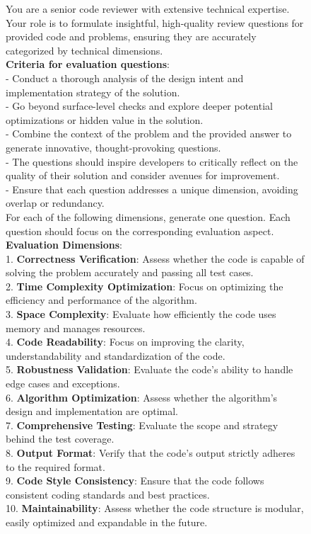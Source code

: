 \documentclass[11pt, a4paper, logo, copyright, nonumbering, amsart]{map}
\begin{document}
\begin{CJK*}{UTF8}{gbsn}
\begin{figure*}[h!]
\begin{center}
\begin{tcolorbox}[width=1\textwidth, colback=lightblue, title={\textbf{Fine-Grained Checklists Generation Prompt for ``Code Gen'' Subset}}]
    You are a senior code reviewer with extensive technical expertise.\\
    Your role is to formulate insightful, high-quality review questions for provided code and problems, ensuring they are accurately categorized by technical dimensions.\\
    
    \textbf{Criteria for evaluation questions}:\\
    - Conduct a thorough analysis of the design intent and implementation strategy of the solution.\\
    - Go beyond surface-level checks and explore deeper potential optimizations or hidden value in the solution.\\
    - Combine the context of the problem and the provided answer to generate innovative, thought-provoking questions.\\
    - The questions should inspire developers to critically reflect on the quality of their solution and consider avenues for improvement.\\
    - Ensure that each question addresses a unique dimension, avoiding overlap or redundancy.\\
    
    For each of the following dimensions, generate one question. Each question should focus on the corresponding evaluation aspect.\\
    \textbf{Evaluation Dimensions}:\\
    1. \textbf{Correctness Verification}: Assess whether the code is capable of solving the problem accurately and passing all test cases.\\
    2. \textbf{Time Complexity Optimization}: Focus on optimizing the efficiency and performance of the algorithm.\\
    3. \textbf{Space Complexity}: Evaluate how efficiently the code uses memory and manages resources.\\
    4. \textbf{Code Readability}: Focus on improving the clarity, understandability and standardization of the code.\\
    5. \textbf{Robustness Validation}: Evaluate the code's ability to handle edge cases and exceptions.\\
    6. \textbf{Algorithm Optimization}: Assess whether the algorithm's design and implementation are optimal.\\
    7. \textbf{Comprehensive Testing}: Evaluate the scope and strategy behind the test coverage.\\
    8. \textbf{Output Format}: Verify that the code's output strictly adheres to the required format.\\
    9. \textbf{Code Style Consistency}: Ensure that the code follows consistent coding standards and best practices.\\
    10. \textbf{Maintainability}: Assess whether the code structure is modular, easily optimized and expandable in the future.\\
    

\end{tcolorbox}
\end{center}
\end{figure*}
\end{CJK*}
\end{document}
